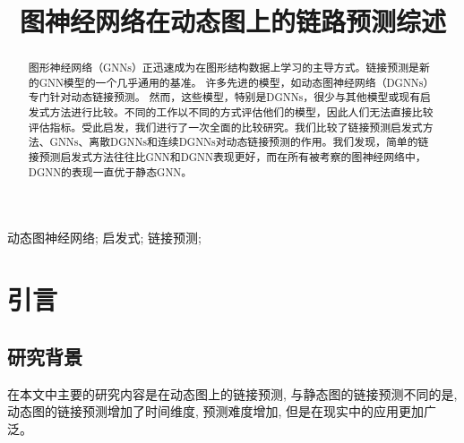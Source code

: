 \documentclass[conference]{IEEEtran}
\begin{document}
% 

\title{图神经网络在动态图上的链路预测综述}

\author{
}

\maketitle

\thispagestyle{fancy} %
\lhead{} %
\chead{} %
\rhead{} %
\lfoot{} %
\cfoot{\thepage} %
\rfoot{} %
\renewcommand{\headrulewidth}{0pt} %
\renewcommand{\footrulewidth}{0pt} %

\pagestyle{fancy}
\cfoot{\thepage}


\begin{abstract}
图形神经网络（GNNs）正迅速成为在图形结构数据上学习的主导方式。链接预测是新的GNN模型的一个几乎通用的基准。
许多先进的模型，如动态图神经网络（DGNNs）专门针对动态链接预测。	然而，这些模型，特别是DGNNs，很少与其他模型或现有启发式方法进行比较。不同的工作以不同的方式评估他们的模型，因此人们无法直接比较评估指标。受此启发，我们进行了一次全面的比较研究。我们比较了链接预测启发式方法、GNNs、离散DGNNs和连续DGNNs对动态链接预测的作用。我们发现，简单的链接预测启发式方法往往比GNN和DGNN表现更好，而在所有被考察的图神经网络中，DGNN的表现一直优于静态GNN。
\end{abstract}

\begin{IEEEkeywords}
动态图神经网络; 启发式; 链接预测;
\end{IEEEkeywords}

\section{引言}
\subsection{研究背景}
在本文中主要的研究内容是在动态图上的链接预测, 与静态图的链接预测不同的是, 动态图的链接预测增加了时间维度, 预测难度增加, 但是在现实中的应用更加广泛。
\end{document}
